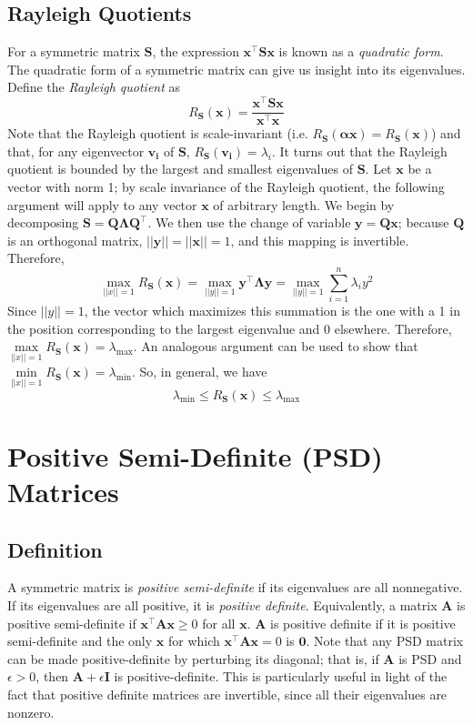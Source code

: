 \documentclass{article}
\begin{document}
\subsection{Rayleigh Quotients}
For a symmetric matrix $\mathbf{S}$, the expression $\mathbf{x^{\top}Sx}$ is known as a \textit{quadratic form}. The quadratic form of a symmetric matrix can give us insight into its eigenvalues. Define the \textit{Rayleigh quotient} as $$R_{\mathbf{S}}(\mathbf{x}) = \frac{\mathbf{x^{\top}Sx}}{\mathbf{x^{\top}x}}$$ Note that the Rayleigh quotient is scale-invariant (i.e. $R_{\mathbf{S}}(\mathbf{\alpha x}) = R_{\mathbf{S}}(\mathbf{x})$) and that, for any eigenvector $\mathbf{v_i}$ of $\mathbf{S}$, $R_{\mathbf{S}}(\mathbf{v_i}) = \lambda_i$. It turns out that the Rayleigh quotient is bounded by the largest and smallest eigenvalues of $\mathbf{S}$. Let $\mathbf{x}$ be a vector with norm 1; by scale invariance of the Rayleigh quotient, the following argument will apply to any vector $\mathbf{x}$ of arbitrary length. We begin by decomposing $\mathbf{S} = \mathbf{Q\Lambda Q^{\top}}$. We then use the change of variable $\mathbf{y} = \mathbf{Qx}$; because $\mathbf{Q}$ is an orthogonal matrix, $||\mathbf{y}|| = ||\mathbf{x}|| = 1$, and this mapping is invertible. Therefore, $$\max\limits_{||x|| = 1} R_{\mathbf{S}}(\mathbf{x}) = \max\limits_{||y|| = 1} \mathbf{y^{\top}\Lambda y} =\max\limits_{||y|| = 1} \sum\limits_{i=1}^n \lambda_i y^2$$ Since $||y|| = 1$, the vector which maximizes this summation is the one with a 1 in the position corresponding to the largest eigenvalue and 0 elsewhere. Therefore, $\max\limits_{||x|| = 1} R_{\mathbf{S}}(\mathbf{x}) = \lambda_{\max}$. An analogous argument can be used to show that $\min\limits_{||x|| = 1} R_{\mathbf{S}}(\mathbf{x}) = \lambda_{\min}$. So, in general, we have $$\lambda_{\min} \leq R_{\mathbf{S}}(\mathbf{x}) \leq \lambda_{\max}$$

\section{Positive Semi-Definite (PSD) Matrices}

\subsection{Definition}
A symmetric matrix is \textit{positive semi-definite} if its eigenvalues are all nonnegative. If its eigenvalues are all positive, it is \textit{positive definite}. Equivalently, a matrix $\mathbf{A}$ is positive semi-definite if $\mathbf{x^{\top}Ax} \geq 0$ for all $\mathbf{x}$. $\mathbf{A}$ is positive definite if it is positive semi-definite and the only $\mathbf{x}$ for which $\mathbf{x^{\top}Ax} = 0$ is $\mathbf{0}$. Note that any PSD matrix can be made positive-definite by perturbing its diagonal; that is, if $\mathbf{A}$ is PSD and $\epsilon > 0$, then $\mathbf{A} + \epsilon\mathbf{I}$ is positive-definite. This is particularly useful in light of the fact that positive definite matrices are invertible, since all their eigenvalues are nonzero.
\end{document}
